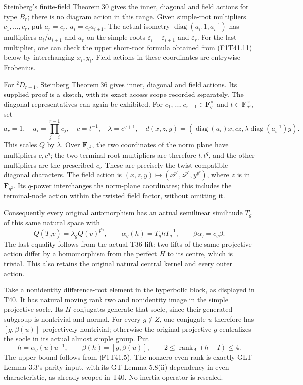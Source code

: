 Steinberg's finite-field Theorem 30 gives the inner,
diagonal and field actions for type \(B_r\); there is
no diagram action in this range. Given simple-root
multipliers \(c_1,\ldots,c_r\), put
\(a_r=c_r\), \(a_i=c_i a_{i+1}\).
The actual isometry
\(\operatorname{diag}(a_i,1,a_i^{-1})\)
has multipliers \(a_i/a_{i+1}\) and \(a_r\) on
the simple roots \(\varepsilon_i-\varepsilon_{i+1}\)
and \(\varepsilon_r\). For the last multiplier,
one can check the upper short-root formula obtained
from (F1T41.11) below by interchanging \(x_i,y_i\).
Field actions in these coordinates are entrywise Frobenius.

For \({}^2D_{r+1}\), Steinberg Theorem 36 gives inner,
diagonal and field actions. Its supplied proof is a
sketch, with its exact access scope recorded separately.
The diagonal representatives can again be exhibited.
For \(c_1,\ldots,c_{r-1}\in\mathbf F_q^\times\)
and \(t\in\mathbf F_{q^2}^\times\), set
\[
 a_r=1,\quad a_i=\prod_{j=i}^{r-1}c_j,
 \quad c=t^{-1},\quad\lambda=c^{q+1},
 \quad d(x,z,y)=(\operatorname{diag}(a_i)x,c z,
                         \lambda\operatorname{diag}(a_i^{-1})y).
 \tag{F1T41.4}
\]
This scales \(Q\) by \(\lambda\). Over \(\mathbf F_{q^2}\),
the two coordinates of the norm plane have multipliers
\(c,c^q\); the two terminal-root multipliers are
therefore \(t,t^q\), and the other multipliers are
the prescribed \(c_i\). These are precisely the
twist-compatible diagonal characters. The field action
is \((x,z,y)\mapsto(x^{p^e},z^{p^e},y^{p^e})\),
where \(z\) is in \(\mathbf F_{q^2}\).
Its \(q\)-power interchanges the norm-plane coordinates;
this includes the terminal-node action within the
twisted field factor, without omitting it.

Consequently every original automorphism has an actual
semilinear similitude \(T_g\) of this same natural space
with
\[
 Q(T_gv)=\lambda_g Q(v)^{p^{e_g}},\qquad
 \alpha_g(h)=T_g hT_g^{-1},\qquad
                         \beta\alpha_g=c_g\beta.
 \tag{F1T41.5}
\]
The last equality follows from the actual T36 lift:
two lifts of the same projective action differ by a
homomorphism from the perfect \(H\) to its centre,
which is trivial. This also retains the original natural
central kernel and every outer action.

Take a nonidentity difference-root element in the
hyperbolic block, as displayed in T40. It has natural
moving rank two and nonidentity image in the simple
projective socle. Its \(H\)-conjugates generate that
socle, since their generated subgroup is nontrivial and
normal. For every \(g\notin Z\), one conjugate \(u\)
therefore has \([g,\beta(u)]\) projectively nontrivial;
otherwise the original projective \(g\) centralizes
the socle in its actual almost simple group. Put
\[
 h=\alpha_g(u)u^{-1},\qquad
 \beta(h)=[g,\beta(u)],\qquad
                    2\le\operatorname{rank}_A(h-I)\le4.
 \tag{F1T41.6}
\]
The upper bound follows from (F1T41.5). The nonzero
even rank is exactly GLT Lemma 3.3's parity input,
with its GT Lemma 5.8(ii) dependency in even characteristic,
as already scoped in T40. No inertia operator is rescaled.

